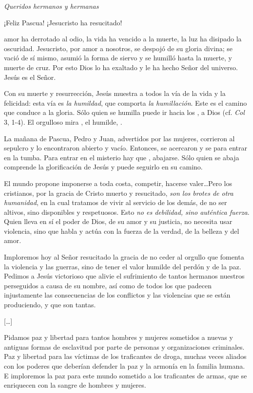 \begin{body}
\textit{Queridos hermanos y hermanas}

¡Feliz Pascua! ¡Jesucristo ha resucitado!

 amor ha derrotado al odio, la vida ha vencido a la muerte, la luz ha disipado la oscuridad. Jesucristo, por amor a nosotros, se despojó de su gloria divina; se vació de sí mismo, asumió la forma de siervo y se humilló hasta la muerte, y muerte de cruz. Por esto Dios lo ha exaltado y le ha hecho Señor del universo. Jesús es el Señor.

Con su muerte y resurrección, Jesús muestra a todos la vía de la vida y la felicidad: esta vía es \textit{la humildad}, que comporta \textit{la humillación}. Este es el camino que conduce a la gloria. Sólo quien se humilla puede ir hacia los , a Dios (cf. \textit{Col} 3, 1-4). El orgulloso mira , el humilde, .

La mañana de Pascua, Pedro y Juan, advertidos por las mujeres, corrieron al sepulcro y lo encontraron abierto y vacío. Entonces, se acercaron y se  para entrar en la tumba. Para entrar en el misterio hay que , abajarse. Sólo quien se abaja comprende la glorificación de Jesús y puede seguirlo en su camino.

El mundo propone imponerse a toda costa, competir, hacerse valer\ldots Pero los cristianos, por la gracia de Cristo muerto y resucitado, \textit{son los brotes de otra humanidad}, en la cual tratamos de vivir al servicio de los demás, de no ser altivos, sino disponibles y respetuosos. Esto \textit{no es debilidad, sino auténtica fuerza}. Quien lleva en sí el poder de Dios, de su amor y su justicia, no necesita usar violencia, sino que habla y actúa con la fuerza de la verdad, de la belleza y del amor.

Imploremos hoy al Señor resucitado la gracia de no ceder al orgullo que fomenta la violencia y las guerras, sino de tener el valor humilde del perdón y de la paz. Pedimos a Jesús victorioso que alivie el sufrimiento de tantos hermanos nuestros perseguidos a causa de su nombre, así como de todos los que padecen injustamente las consecuencias de los conflictos y las violencias que se están produciendo, y que son tantas.

[\ldots] 

Pidamos paz y libertad para tantos hombres y mujeres sometidos a nuevas y antiguas formas de esclavitud por parte de personas y organizaciones criminales. Paz y libertad para las víctimas de los traficantes de droga, muchas veces aliados con los poderes que deberían defender la paz y la armonía en la familia humana. E imploremos la paz para este mundo sometido a los traficantes de armas, que se enriquecen con la sangre de hombres y mujeres.


\end{body}
